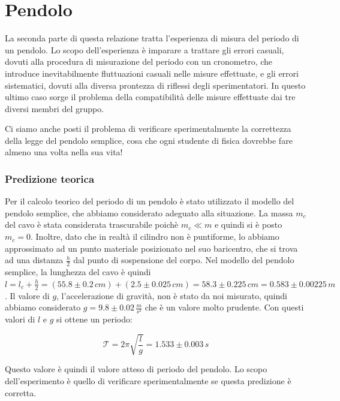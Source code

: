 \newpage

\section{Pendolo}

La seconda parte di questa relazione tratta l'esperienza di misura del periodo
di un pendolo. Lo scopo dell'esperienza è imparare a trattare gli errori
casuali, dovuti alla procedura di misurazione del periodo con un cronometro,
che introduce inevitabilmente fluttuazioni casuali nelle misure effettuate,
e gli errori sistematici, dovuti alla diversa prontezza di riflessi degli
sperimentatori. In questo ultimo caso sorge il problema della 
compatibilità delle misure effettuate dai tre diversi membri del gruppo.

Ci siamo anche posti il problema di verificare sperimentalmente la
correttezza della legge del pendolo semplice, cosa che ogni studente di
fisica dovrebbe fare almeno una volta nella sua vita!

\subsubsection{Predizione teorica}

Per il calcolo teorico del periodo di un pendolo è stato utilizzato il modello del pendolo
semplice, che abbiamo considerato adeguato alla situazione. La massa $m_c$ del
cavo è stata considerata trascurabile poichè $m_c \ll m$ e quindi si è posto
$m_c = 0$. Inoltre, dato che in realtà il cilindro non è puntiforme, lo abbiamo approssimato ad un punto
materiale posizionato nel suo baricentro, che si trova ad una distanza
$\frac{h}{2}$ dal punto di sospensione del corpo.
Nel modello del pendolo semplice, la lunghezza del cavo è quindi
$l = l_c + \frac{h}{2} = (55.8 \pm 0.2 \, cm) + (2.5 \pm 0.025 \, cm) = 58.3 \pm 0.225 \, cm = 0.583 \pm 0.00225 \, m$.
Il valore di $g$, l'accelerazione di gravità, non è stato da noi misurato,
quindi abbiamo considerato $g = 9.8 \pm 0.02 \, \frac{m}{s^2}$ che è un
valore molto prudente. Con questi valori di $l$ e $g$ si ottene un periodo:

\begin{equation*}
    \mathcal{T} = 2\pi \sqrt{\frac{l}{g}} = 1.533 \pm 0.003 \, s 
\end{equation*}

Questo valore è quindi il valore atteso di periodo del pendolo.
Lo scopo dell'esperimento è quello di verificare sperimentalmente se questa predizione
è corretta.

